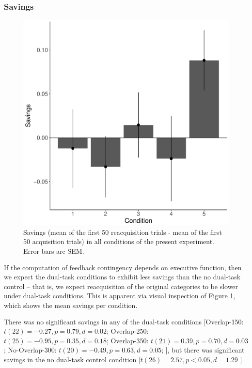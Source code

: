 \documentclass[apacite,draftfirst,man]{apa6}
\begin{document}
\subsubsection*{Savings}
\begin{figure}[t]
\centering \includegraphics[width=1.0\textwidth]{../figures/fig_savings.pdf}
\caption{Savings (mean of the first 50 reacquisition trials - mean of the first
  50 acquisition trials) in all conditions of the present experiment.
  Error bars are SEM.}
  \label{fig:savings}
\end{figure}

If the computation of feedback contingency depends on executive function, then
we expect the dual-task conditions to exhibit less savings than the no dual-task
control -- that is, we expect reacquisition of the original categories to be
slower under dual-task conditions. This is apparent via visual inspection of
Figure \ref{fig:savings}, which shows the mean savings per condition.

There was no significant savings in any of the dual-task conditions
[Overlap-150: $t(22) = -0.27, p = 0.79, d = 0.02$; Overlap-250: $t(25) = -0.95,
p = 0.35, d = 0.18$; Overlap-350: $t(21) = 0.39, p = 0.70, d = 0.03$;
No-Overlap-300: $t(20) = -0.49, p = 0.63, d = 0.05$; ], but there was
significant savings in the no dual-task control condition [$t(26) =
2.57, p < 0.05, d = 1.29$ ].
\end{document}
